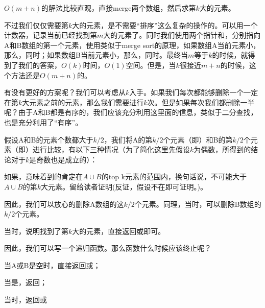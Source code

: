 $O(m+n)$的解法比较直观，直接merge两个数组，然后求第$k$大的元素。

不过我们仅仅需要第$k$大的元素，是不需要“排序”这么复杂的操作的。可以用一个计数器，记录当前已经找到第$m$大的元素了。同时我们使用两个指针和，分别指向A和B数组的第一个元素，使用类似于merge sort的原理，如果数组A当前元素小，那么，同时；如果数组B当前元素小，那么，同时。最终当$m$等于$k$的时候，就得到了我们的答案，$O(k)$时间，$O(1)$空间。但是，当$k$很接近$m+n$的时候，这个方法还是$O(m+n)$的。

有没有更好的方案呢？我们可以考虑从$k$入手。如果我们每次都能够删除一个一定在第$k$大元素之前的元素，那么我们需要进行$k$次。但是如果每次我们都删除一半呢？由于A和B都是有序的，我们应该充分利用这里面的信息，类似于二分查找，也是充分利用了“有序”。

假设A和B的元素个数都大于$k/2$，我们将A的第$k/2$个元素（即）和B的第$k/2$个元素（即）进行比较，有以下三种情况（为了简化这里先假设$k$为偶数，所得到的结论对于$k$是奇数也是成立的）：
\begindot
\item {}
\item {}
\item {}
\myenddot

如果，意味着到\fn{A[k/2-1}的肯定在$A \cup B$的top k元素的范围内，换句话说，不可能大于$A \cup B$的第$k$大元素。留给读者证明(反证，假设不在即可证明。)。

因此，我们可以放心的删除A数组的这$k/2$个元素。同理，当时，可以删除B数组的$k/2$个元素。

当时，说明找到了第$k$大的元素，直接返回或即可。

因此，我们可以写一个递归函数。那么函数什么时候应该终止呢？
\begindot
\item 当A或B是空时，直接返回或；
\item 当是，返回；
\item 当时，返回或
\myenddot


